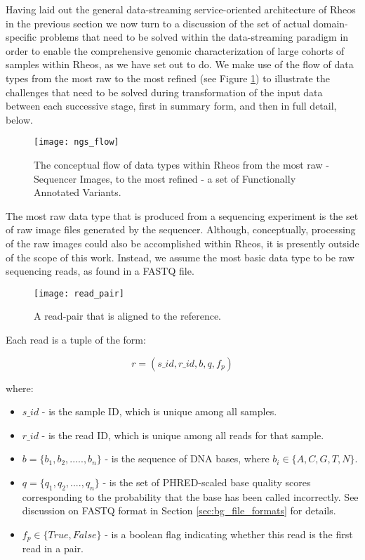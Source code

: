 Having laid out the general data-streaming service-oriented architecture of Rheos in the previous section we now turn to a discussion of the set of actual domain-specific problems that need to be solved within the data-streaming paradigm in order to enable the comprehensive genomic characterization of large cohorts of samples within Rheos, as we have set out to do. We make use of the flow of data types from the most raw to the most refined (see Figure \ref{fig:ngs_flow}) to illustrate the challenges that need to be solved during transformation of the input data between each successive stage, first in summary form, and then in full detail, below.

\begin{figure}[H]
\texttt{[image: ngs\_flow]}
\centering
\caption {The conceptual flow of data types within Rheos from the most raw - Sequencer Images, to the most refined - a set of Functionally Annotated Variants.}
\label{fig:ngs_flow}
\end{figure}
    
The most raw data type that is produced from a sequencing experiment is the set of raw image files generated by the sequencer. Although, conceptually, processing of the raw images could also be accomplished within Rheos, it is presently outside of the scope of this work. Instead, we assume the most basic data type to be raw sequencing reads, as found in a FASTQ\autocite{cock2009sanger} file. 

\begin{figure}[H]
\texttt{[image: read\_pair]}
\centering
\caption {A read-pair that is aligned to the reference.}
\label{fig:rheos_read_pair}
\end{figure}

Each read is a tuple of the form:

\begin{equation}
\label{eq:raw_read_message}
r = (s\_id, r\_id, b, q, f_p)
\end{equation}

where:

\begin{itemize}
    \item $s\_id$ - is the sample ID, which is unique among all samples.
    \item $r\_id$ - is the read ID, which is unique among all reads for that sample.
    \item $b = \{b_1, b_2,.....,b_n\}$ - is the sequence of DNA bases, where $b_i \in \{A,C,G,T,N\}$.
    \item $q = \{q_1, q_2,....,q_n\}$ - is the set of PHRED-scaled base quality scores corresponding to the probability that the base has been called incorrectly. See discussion on FASTQ format in Section \ref{sec:bg_file_formats} for details.
    \item $f_p \in \{True, False\}$ - is a boolean flag indicating whether this read is the first read in a pair.
\end{itemize}


